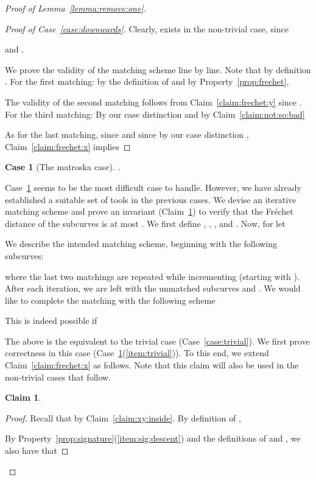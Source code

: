 \documentclass[11pt, letter]{article}
\newtheorem{claim}[theorem]{Claim}
\newtheorem{case}[]{Case}
\newcommand{\lemref}[1]{Lemma~\ref{lemma:#1}}
\newcommand{\caselab}[1]{\label{case:#1}}
\newcommand{\caseref}[1]{Case~\ref{case:#1}}
\newcommand{\claimlab}[1]{\label{claim:#1}}
\newcommand{\claimref}[1]{Claim~\ref{claim:#1}}
\newcommand{\propref}[1]{Property~\ref{prop:#1}}
\newcommand{\Frechet}{Fr\'echet\xspace}
\begin{document}
\begin{proof}[Proof of \lemref{remove:one}]
\begin{proof}[Proof of \caseref{downwards}]
Clearly,  exists in the non-trivial case, since  

and .

We prove the validity of the matching scheme line by line.
Note that by definition .
For the first matching:
by the definition of  and by \propref{frechet},

The validity of the second matching follows from \claimref{frechet:y} since .
For the third matching:
By our case distinction and by \claimref{not:so:bad}

As for the last matching, since  and since by our case distinction
, \claimref{frechet:x} implies

\end{proof}





\begin{case}[The matroska case] .
\caselab{matroska}
\end{case}
\caseref{matroska} seems to be the most difficult case to handle. However, we have
already established a suitable set of tools in the previous cases. We devise an iterative
matching scheme and prove an invariant (\claimref{frechet:xa}) to verify that the \Frechet distance of
the subcurves is at most .
We first define , , 
, and .
Now, for  let 

We describe the intended matching scheme, beginning with the following subcurves:

where the last two matchings are repeated while incrementing  (starting with
).   After each iteration, we are left with the
unmatched subcurves  and .  
We would like to complete the matching with the following scheme


This is indeed possible if 

The above is the equivalent to the trivial case (\caseref{trivial}).  
We first prove correctness in this case (\caseref{matroska}(\ref{item:trivial})). To this end, we extend
\claimref{frechet:x} as follows. Note that this claim will also be used in the non-trivial cases that follow.

\begin{claim}

\claimlab{frechet:xa}
\end{claim}
\begin{proof}
Recall that  by
\claimref{xy:inside}.
By definition of ,

By \propref{signature}(\ref{item:sig:descent}) and the definitions of  and , we also have that


\end{proof}
\end{proof}
\end{document}
